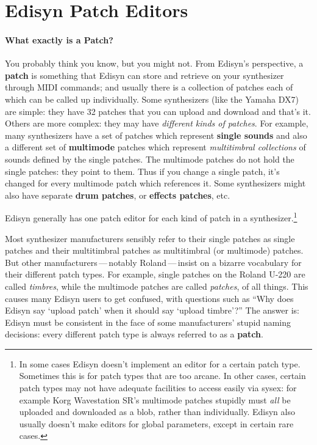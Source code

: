 \documentclass{article}
\begin{document}
\section{Edisyn Patch Editors}

\paragraph{What exactly is a Patch?}  You probably think you know, but you might not.  From Edisyn's perspective, a {\bf patch} is something that Edisyn can store and retrieve on your synthesizer through MIDI commands; and usually there is a collection of patches each of which can be called up individually.  Some synthesizers (like the Yamaha DX7) are simple: they have 32 patches that you can upload and download and that's it.  Others are more complex: they may have {\it different kinds of patches}.  For example, many synthesizers have a set of patches which represent {\bf single sounds} and also a different set of {\bf multimode} patches which represent {\it multitimbral collections} of sounds defined by the single patches.  The multimode patches do not hold the single patches: they point to them.  Thus if you change a single patch, it's changed for every multimode patch which references it.  Some synthesizers might also have separate {\bf drum patches}, or {\bf effects patches}, etc.

Edisyn generally has one patch editor for each kind of patch in a synthesizer.\footnote{In some cases Edisyn doesn't implement an editor for a certain patch type.  Sometimes this is for patch types that are too arcane.  In other cases, certain patch types may not have adequate facilities to access easily via sysex: for example Korg Wavestation SR's multimode patches stupidly must {\it all} be uploaded and downloaded as a blob, rather than individually.  Edisyn also usually doesn't make editors for global parameters, except in certain rare cases.}

Most synthesizer manufacturers sensibly refer to their single patches as single patches and their multitimbral patches as multitimbral (or multimode) patches.  But other manufacturers\,---\,notably Roland\,---\,insist on a bizarre vocabulary for their different patch types.  For example, single patches on the Roland U-220 are called {\it timbres}, while the multimode patches are called {\it patches}, of all things.  This causes many Edisyn users to get confused, with questions such as ``Why does Edisyn say `upload patch' when it should say `upload timbre'?''  The answer is: Edisyn must be consistent in the face of some manufacturers' stupid naming decisions: every different patch type is always referred to as a {\bf patch}.
\end{document}
